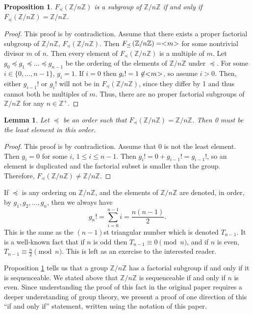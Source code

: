 \documentclass{article}
\newcommand{\ZZ}{\mathbb{Z}}
\newcommand{\ZnZ}{\ZZ/n\ZZ}
\newcommand{\FZ}{F_{\preceq}\left(\ZZ/n\ZZ\right)}
\newtheorem{prop}{Proposition}
\newtheorem{lemma}{Lemma}
\begin{document}
\begin{prop}\label{fullgroupprop}
$\FZ$ is a subgroup of $\ZnZ$ if and only if $\FZ = \ZnZ$.  
\end{prop}

\begin{proof} This proof is by contradiction. Assume that there exists a proper factorial subgroup of $\ZnZ$, $\FZ$. Then $\FZ=< \negmedspace m \negmedspace >$ for some nontrivial divisor $m$ of $n$. Then every element of $\FZ$ is a multiple of $m$. Let $g_0\preceq g_1\preceq ...\preceq g_{n-1}$ be the ordering of the elements of $\ZnZ$ under $\preceq$. For some $i\in\{0,...,n-1\}$, $g_i=1$. If $i=0$ then $g_i!=1\not\in < \negmedspace m \negmedspace >$, so assume $i>0$. Then, either $g_{i-1}!$ or $g_i!$ will not be in $\FZ$, since they differ by 1 and thus cannot both be multiples of $m$. Thus, there are no proper factorial subgroups of $\ZnZ$ for any $n\in\mathbb{Z}^+$. 
\end{proof}

\begin{lemma}\label{zerofirst} Let $\preceq$ be an order such that $\FZ = \ZnZ$. Then 0 must be the least element in this order.
\end{lemma}
\begin{proof} This proof is by contradiction. Assume that $0$ is not the least element. Then $g_i=0$ for some $i$, $1\leq i\leq n-1$. Then $g_i!=0+g_{i-1}!=g_{i-1}!$, so an element is duplicated and the factorial subset is smaller than the group. Therefore, $\FZ \neq \ZnZ$.
\end{proof}


If $\preceq$ is any ordering on $\ZnZ$, and the elements of $\ZnZ$ are denoted, in order, by $g_1,g_2,...,g_n$, then we always have
\[g_n!=\sum_{i=0}^{n-1} i = \frac{n(n-1)}{2}.\]
This is the same as the $(n-1)$st triangular number which is denoted $T_{n-1}$. It is a well-known fact that if $n$ is odd then $T_{n-1}\equiv0\pmod{n}$, and if $n$ is even, $T_{n-1}\equiv\frac{n}{2}\pmod{n}$. This is left as an exercise to the interested reader. 


Proposition \ref{fullgroupprop} tells us that a group $\ZnZ$ has a factorial subgroup if and only if it is sequenceable. We stated above that $\ZnZ$ is sequenceable if and only if $n$ is even. Since understanding the proof of this fact in the original paper requires a deeper understanding of group theory, we present a proof of one direction of this ``if and only if'' statement, written using the notation of this paper.
\end{document}
